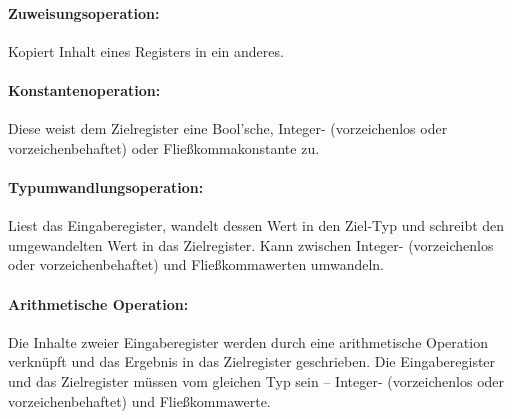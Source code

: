 \documentclass[twoside,a4paper,fleqn,12pt]{book}
\begin{document}
\paragraph{Zuweisungsoperation:} Kopiert Inhalt eines Registers in ein anderes.

\paragraph{Konstantenoperation:} Diese weist dem Zielregister eine Bool'sche, Integer- (vorzeichenlos oder vorzeichenbehaftet) oder
Fließkommakonstante zu.

\paragraph{Typumwandlungsoperation:} Liest das Eingaberegister, wandelt dessen Wert in den Ziel-Typ und schreibt den umgewandelten Wert in das Zielregister.
Kann zwischen Integer- (vorzeichenlos oder vorzeichenbehaftet) und Fließkommawerten umwandeln.

\paragraph{Arithmetische Operation:} Die Inhalte zweier Eingaberegister 
werden durch eine arithmetische Operation verknüpft und das Ergebnis in das Zielregister geschrieben.
Die Eingaberegister und das Zielregister müssen vom gleichen Typ sein -- Integer- (vorzeichenlos oder vorzeichenbehaftet) und Fließkommawerte.
\end{document}
